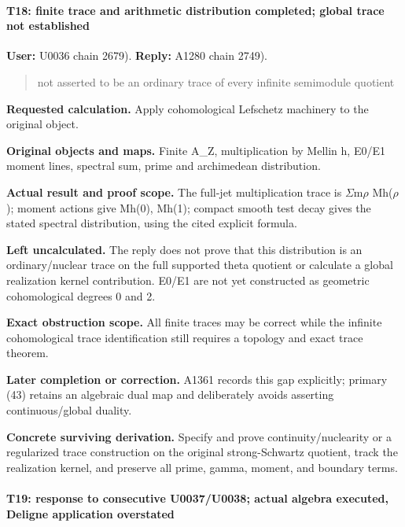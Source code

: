 \paragraph{T18: finite trace and arithmetic distribution completed;
global trace not
established}\label{t18-finite-trace-and-arithmetic-distribution-completed-global-trace-not-established}

\textbf{User:} U0036
\protect{} chain 2679).
\textbf{Reply:} A1280
\protect{} chain 2749).

\begin{quote}
not asserted to be an ordinary trace of every infinite semimodule
quotient
\end{quote}

\textbf{Requested calculation.} Apply cohomological Lefschetz machinery
to the original object.

\textbf{Original objects and maps.} Finite A\_Z, multiplication by
Mellin h, E0/E1 moment lines, spectral sum, prime and archimedean
distribution.

\textbf{Actual result and proof scope.} The full-jet multiplication
trace is
\allowbreak{}\ensuremath{Σ}\allowbreak{}m\allowbreak{}\ensuremath{ρ}\allowbreak{}
Mh(\allowbreak{}\ensuremath{ρ}\allowbreak{}); moment actions give Mh(0),
Mh(1); compact smooth test decay gives the stated spectral distribution,
using the cited explicit formula.

\textbf{Left uncalculated.} The reply does not prove that this
distribution is an ordinary/nuclear trace on the full supported theta
quotient or calculate a global realization kernel contribution. E0/E1
are not yet constructed as geometric cohomological degrees 0 and 2.

\textbf{Exact obstruction scope.} All finite traces may be correct while
the infinite cohomological trace identification still requires a
topology and exact trace theorem.

\textbf{Later completion or correction.} A1361 records this gap
explicitly; primary (43) retains an algebraic dual map and deliberately
avoids asserting continuous/global duality.

\textbf{Concrete surviving derivation.} Specify and prove
continuity/nuclearity or a regularized trace construction on the
original strong-Schwartz quotient, track the realization kernel, and
preserve all prime, gamma, moment, and boundary terms.

\paragraph{T19: response to consecutive U0037/U0038; actual algebra
executed, Deligne application
overstated}\label{t19-response-to-consecutive-u0037u0038-actual-algebra-executed-deligne-application-overstated}

